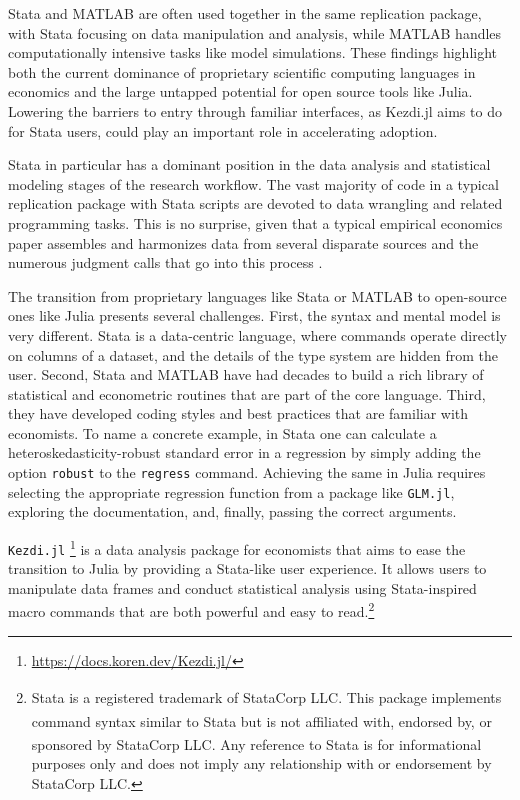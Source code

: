 \documentclass{juliacon}
\begin{document}
Stata and MATLAB are often used together in the same replication package, with Stata focusing on data manipulation and analysis, while MATLAB handles computationally intensive tasks like model simulations. These findings highlight both the current dominance of proprietary scientific computing languages in economics and the large untapped potential for open source tools like Julia. Lowering the barriers to entry through familiar interfaces, as Kezdi.jl aims to do for Stata users, could play an important role in accelerating adoption.

Stata in particular has a dominant position in the data analysis and statistical modeling stages of the research workflow. The vast majority of code in a typical replication package with Stata scripts are devoted to data wrangling and related programming tasks. This is no surprise, given that a typical empirical economics paper assembles and harmonizes data from several disparate sources and the numerous judgment calls that go into this process \cite{huntington2021influence}.

The transition from proprietary languages like Stata or MATLAB to open-source ones like Julia presents several challenges. First, the syntax and mental model is very different. Stata is a data-centric language, where commands operate directly on columns of a dataset, and the details of the type system are hidden from the user. Second, Stata and MATLAB have had decades to build a rich library of statistical and econometric routines that are part of the core language. Third, they have developed coding styles and best practices that are familiar with economists. To name a concrete example, in Stata one can calculate a heteroskedasticity-robust standard error in a regression by simply adding the option \texttt{robust} to the \texttt{regress} command. Achieving the same in Julia requires selecting the appropriate regression function from a package like \texttt{GLM.jl}, exploring the documentation, and, finally, passing the correct arguments.

\texttt{Kezdi.jl} \footnote{\url{https://docs.koren.dev/Kezdi.jl/}} is a data analysis package for economists that aims to ease the transition to Julia by providing a Stata-like user experience. It allows users to manipulate data frames and conduct statistical analysis using Stata-inspired macro commands that are both powerful and easy to read.\footnote{Stata\textsuperscript{\textregistered} is a registered trademark of StataCorp LLC. This package implements command syntax similar to Stata\textsuperscript{\textregistered} but is not affiliated with, endorsed by, or sponsored by StataCorp LLC. Any reference to Stata\textsuperscript{\textregistered} is for informational purposes only and does not imply any relationship with or endorsement by StataCorp LLC.}
\end{document}

